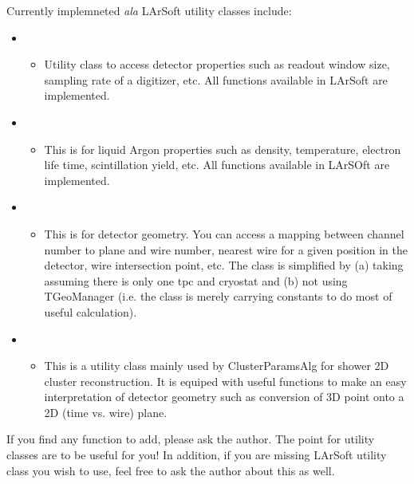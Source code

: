 Currently implemneted {\it ala} LArSoft utility classes include:
\begin{itemize}
  \item \DetectorProperties
    \begin{itemize}
      \item Utility class to access detector properties such as readout window size, sampling rate of a digitizer, etc. All functions available in LArSoft are implemented.
    \end{itemize}

  \item \LArProperties
    \begin{itemize}
      \item This is for liquid Argon properties such as density, temperature, electron life time, scintillation yield, etc. All functions available in LArSOft are implemented.
    \end{itemize}

  \item \Geometry
    \begin{itemize}
      \item This is for detector geometry. You can access a mapping between channel number to plane and wire number, nearest wire for a given position in the detector, wire intersection point, etc. The class is simplified by (a) taking assuming there is only one tpc and cryostat and (b) not using TGeoManager (i.e. the class is merely carrying constants to do most of useful calculation).
    \end{itemize}

  \item \GeometryUtilities
     \begin{itemize}
       \item This is a utility class mainly used by {\ttfamily ClusterParamsAlg} for shower 2D cluster reconstruction. It is equiped with useful functions to make an easy interpretation of detector geometry such as conversion of 3D point onto a 2D (time vs. wire) plane.
     \end{itemize}

\end{itemize}

If you find any function to add, please ask the author. The point for utility classes are to be useful for you! In addition, if you are missing LArSoft utility class you wish to use, feel free to ask the author about this as well.
